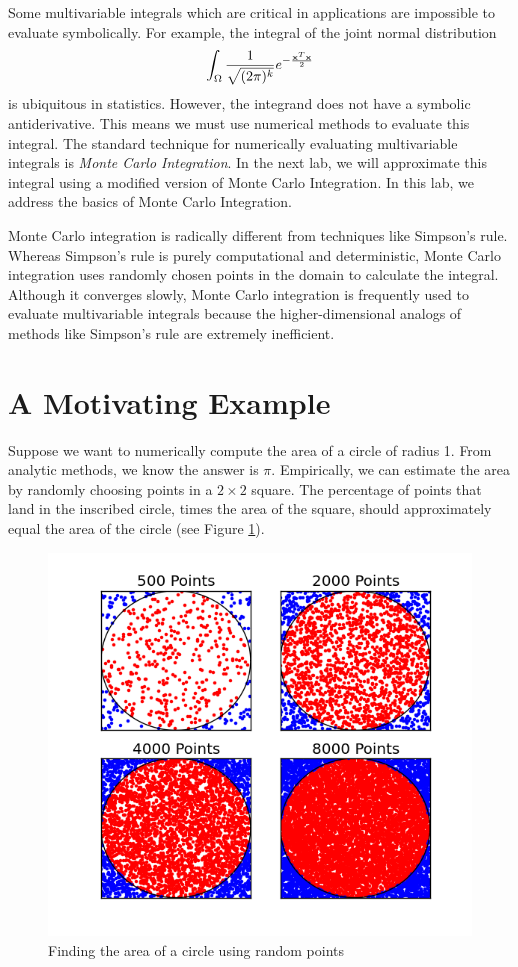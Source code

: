 
Some multivariable integrals which are critical in applications are impossible to evaluate symbolically.
For example, the integral of the joint normal distribution
\[
\int_{\Omega} \frac{1}{\sqrt{(2 \pi)^k}} e^{- \frac{\bold{x}^T\bold{x}}{2}}
\]
is ubiquitous in statistics.
However, the integrand does not have a symbolic antiderivative.
This means we must use numerical methods to evaluate this integral. The standard technique for numerically evaluating multivariable integrals is \emph{Monte Carlo Integration}. In the next lab, we will approximate this integral using a modified version of Monte Carlo Integration. In this lab, we address the basics of Monte Carlo Integration.

Monte Carlo integration is radically different from techniques like Simpson's rule. Whereas Simpson's rule is purely computational and deterministic, Monte Carlo integration uses randomly chosen points  in the domain to calculate the integral.
Although it converges slowly, Monte Carlo integration is frequently used to evaluate multivariable integrals because the higher-dimensional analogs of methods like Simpson's rule are extremely inefficient.

\section*{A Motivating Example} %

Suppose we want to numerically compute the area of a circle of radius 1.
From analytic methods, we know the answer is $\pi$.
Empirically, we can estimate the area by randomly choosing points in a $2 \times 2$ square.
The percentage of points that land in the inscribed circle, times the area of the square, should approximately equal the area of the circle (see Figure \ref{fig:MCCircle}).

\begin{figure}
\includegraphics[width=.7\textwidth]{figures/MC.png}
\caption{Finding the area of a circle using random points}
\label{fig:MCCircle}
\end{figure}

